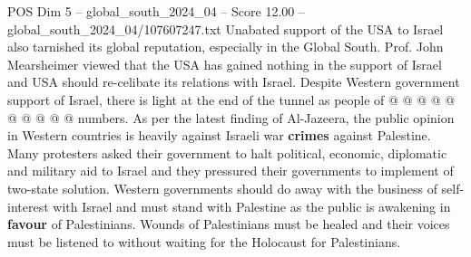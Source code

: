 \begin{textsample}{POS Dim 5 – global\_south\_2024\_04 – Score 12.00 – global\_south\_2024\_04/107607247.txt}
Unabated support of the USA to Israel also tarnished its global reputation, especially in the Global South.
Prof.
John Mearsheimer viewed that the USA has gained nothing in the support of Israel and USA should re-celibate its relations with Israel.
Despite Western government support of Israel, there is light at the end of the tunnel as people of @ @ @ @ @ @ @ @ @ @ numbers.
As per the latest finding of Al-Jazeera, the public opinion in Western countries is heavily against Israeli war \textbf{crimes} against Palestine.
Many protesters asked their government to halt political, economic, diplomatic and military aid to Israel and they pressured their governments to implement of two-state solution.
Western governments should do away with the business of self-interest with Israel and must stand with Palestine as the public is awakening in \textbf{favour} of Palestinians.
Wounds of Palestinians must be healed and their voices must be listened to without waiting for the Holocaust for Palestinians.

\end{textsample}
